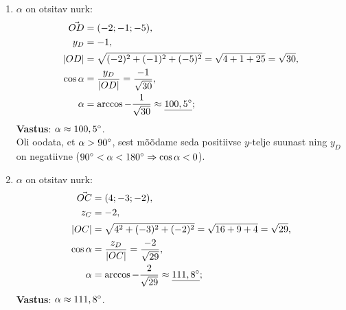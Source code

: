 \documentclass[10pt, a4paper]{article}
\begin{document}
\begin{enumerate}
\item
    $\alpha$ on otsitav nurk:
    \begin{align}
        \nonumber
        \vec{OD} &= (-2; -1; -5), \\
        \nonumber
        y_D &= -1, \\
        \nonumber
        \lvert OD \lvert &= \sqrt{(-2)^2 + (-1)^2 + (-5)^2} = \sqrt{4 + 1 + 25} = \sqrt{30}, \\
        \nonumber
        \cos \alpha &= \frac{y_D}{\lvert OD \lvert} = \frac{-1}{\sqrt{30}},\\
        \nonumber
        \alpha &= \arccos -\frac{1}{\sqrt{30}} \approx \underline{100,5\degree};
    \end{align}
    \textbf{Vastus}: $\alpha \approx 100,5\degree$.\\
    Oli oodata, et $\alpha > 90\degree$, sest mõõdame seda positiivse $y$-telje suunast ning $y_D$ on negatiivne ($90\degree < \alpha < 180\degree \Rightarrow \cos \alpha < 0 $).

\item
$\alpha$ on otsitav nurk:
\begin{align}
    \nonumber
    \vec{OC} &= (4; -3; -2), \\
    \nonumber
    z_C &= -2, \\
    \nonumber
    \lvert OC \lvert &= \sqrt{4^2 + (-3)^2 + (-2)^2} = \sqrt{16 + 9 + 4} = \sqrt{29}, \\
    \nonumber
    \cos \alpha &= \frac{z_D}{\lvert OC \lvert} = \frac{-2}{\sqrt{29}},\\
    \nonumber
    \alpha &= \arccos -\frac{2}{\sqrt{29}} \approx \underline{111,8\degree};
\end{align}
\textbf{Vastus}: $\alpha \approx 111,8\degree$.\\

\end{enumerate}
\end{document}
